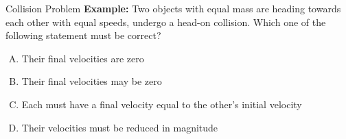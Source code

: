 \documentclass[12pt,compress,aspectratio=169]{beamer}
\begin{document}







\begin{frame}{Collision Problem}
  \textbf{Example:} Two objects with equal mass are heading towards each other
  with equal speeds, undergo a head-on collision. Which one of the following
  statement must be correct?
  \begin{enumerate}[(A)]
  \item Their final velocities are zero
  \item Their final velocities may be zero
  \item Each must have a final velocity equal to the other's initial velocity
  \item Their velocities must be reduced in magnitude
  \end{enumerate}
\end{frame}



%
\end{document}
